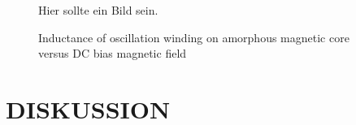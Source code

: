 \documentclass[a4paper, 10pt, conference]{ieeeconf_de}
\begin{document}
   \begin{figure}[thpb]
      \centering
			Hier sollte ein Bild sein.
      \caption{Inductance of oscillation winding on amorphous
       magnetic core versus DC bias magnetic field}
      \label{figurelabel}
   \end{figure}

\section{DISKUSSION}

   

\addtolength{\textheight}{-12cm}  %




\end{document}
